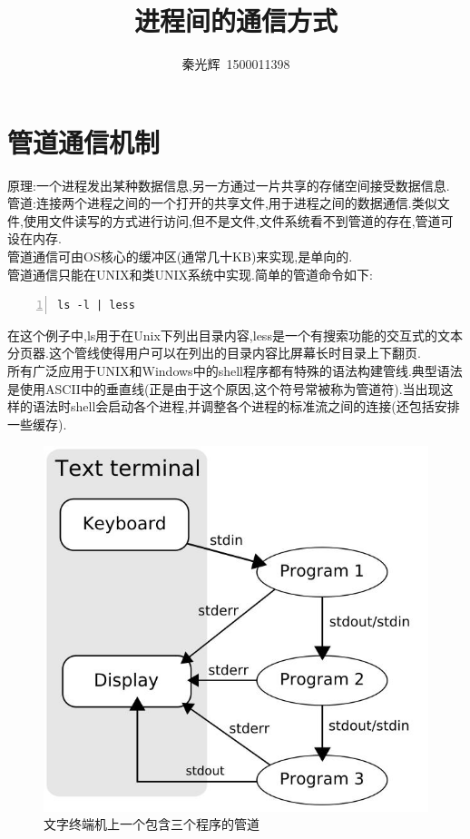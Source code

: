 \documentclass[a4paper,12pt,notitlepage]{article}
\begin{document}
\title{进程间的通信方式}
\author{秦光辉\ 1500011398}
\maketitle

\section{管道通信机制}

	原理:一个进程发出某种数据信息,另一方通过一片共享的存储空间接受数据信息. \\
	
	管道:连接两个进程之间的一个打开的共享文件,用于进程之间的数据通信.类似文件,使用文件读写的方式进行访问,但不是文件,文件系统看不到管道的存在,管道可设在内存. \\
	
	管道通信可由OS核心的缓冲区(通常几十KB)来实现,是单向的. \\
	
	管道通信只能在UNIX和类UNIX系统中实现.简单的管道命令如下:
	
\begin{lstlisting}[frame=shadowbox,numbers=left]
	ls -l | less
\end{lstlisting}

	在这个例子中,ls用于在Unix下列出目录内容,less是一个有搜索功能的交互式的文本分页器.这个管线使得用户可以在列出的目录内容比屏幕长时目录上下翻页. \\
	
	所有广泛应用于UNIX和Windows中的shell程序都有特殊的语法构建管线.典型语法是使用ASCII中的垂直线(正是由于这个原因,这个符号常被称为管道符).当出现这样的语法时shell会启动各个进程,并调整各个进程的标准流之间的连接(还包括安排一些缓存). \\
	
\begin{figure}
\centering
	\includegraphics[scale=0.4]{hw4_1.jpeg}
	\caption{文字终端机上一个包含三个程序的管道}
\end{figure}
	
\end{document}
